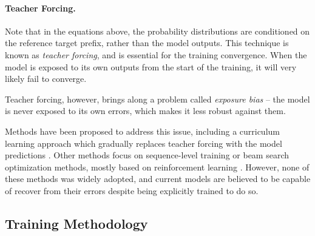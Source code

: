 


\paragraph{Teacher Forcing.}
Note that in the equations above, the probability distributions are conditioned
on the reference target prefix, rather than the model outputs. This technique
is known as \emph{teacher forcing}, and is essential for the training
convergence. When the model is exposed to its own outputs from the start of the
training, it will very likely fail to converge.

Teacher forcing, however, brings along a problem called \emph{exposure bias} --
the model is never exposed to its own errors, which makes it less robust
against them.

Methods have been proposed to address this issue, including a curriculum
learning approach which gradually replaces teacher forcing with the model
predictions \citep{bengio2015scheduled}. Other methods focus on sequence-level
training or beam search optimization methods, mostly based on reinforcement
learning \citep{williams1992simple, wiseman-rush-2016-sequence,
  ranzato2016sequence}. However, none of these methods was widely adopted, and
current models are believed to be capable of recover from their errors despite
being explicitly trained to do so.


\subsection{Training Methodology}
\label{sec:training:methodology}

